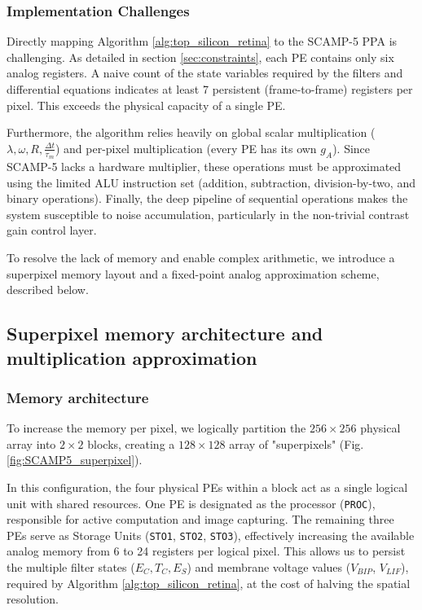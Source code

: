 \documentclass{article}
\begin{document}
\subsubsection*{Implementation Challenges}
Directly mapping Algorithm \ref{alg:top_silicon_retina} to the SCAMP-5 PPA is challenging.  As detailed in section \ref{sec:constraints}, each PE contains only six analog registers. A naive count of the state variables required by the filters and differential equations indicates at least 7 persistent (frame-to-frame) registers per pixel. This exceeds the physical capacity of a single PE.

Furthermore, the algorithm relies heavily on global scalar multiplication ($\lambda, \omega, R, \frac{\Delta t}{\tau_m}$) and per-pixel multiplication (every PE has its own $g_{A}$). Since SCAMP-5 lacks a hardware multiplier, these operations must be approximated using the limited ALU instruction set (addition, subtraction, division-by-two, and binary operations). Finally, the deep pipeline of sequential operations makes the system susceptible to noise accumulation, particularly in the non-trivial contrast gain control layer.

To resolve the lack of memory and enable complex arithmetic, we introduce a superpixel memory layout and a fixed-point analog approximation scheme, described below.

\subsection{Superpixel memory architecture and multiplication approximation}
\label{section:superpixel_arithmetic}
\subsubsection{Memory architecture}
To increase the memory per pixel, we logically partition the $256 \times 256$ physical array into $2 \times 2$ blocks, creating a $128 \times 128$ array of "superpixels" (Fig. \ref{fig:SCAMP5_superpixel}). 

In this configuration, the four physical PEs within a block act as a single logical unit with shared resources. One PE is designated as the processor (\texttt{PROC}), responsible for active computation and image capturing. The remaining three PEs serve as Storage Units (\texttt{STO1}, \texttt{STO2}, \texttt{STO3}), effectively increasing the available analog memory from 6 to 24 registers per logical pixel. This allows us to persist the multiple filter states ($E_C, T_C, E_S$) and membrane voltage values ($V_{BIP}$, $V_{LIF}$), required by Algorithm \ref{alg:top_silicon_retina}, at the cost of halving the spatial resolution. 
\end{document}
